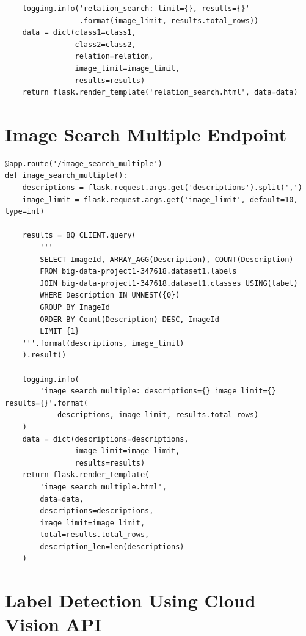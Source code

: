 \documentclass[a4paper, 11pt]{article}
\newenvironment{code}{\captionsetup{type=listing}}{}
\begin{document}
\begin{appendix}
\begin{code}
\begin{verbatim}
    logging.info('relation_search: limit={}, results={}'
                 .format(image_limit, results.total_rows))
    data = dict(class1=class1,
                class2=class2,
                relation=relation,
                image_limit=image_limit,
                results=results)
    return flask.render_template('relation_search.html', data=data)
\end{verbatim}
\label{code:relation_search}
\end{code}

\pagebreak

\section{Image Search Multiple Endpoint}

\begin{code}
\begin{verbatim}
@app.route('/image_search_multiple')
def image_search_multiple():
    descriptions = flask.request.args.get('descriptions').split(',')
    image_limit = flask.request.args.get('image_limit', default=10, type=int)

    results = BQ_CLIENT.query(
        '''
        SELECT ImageId, ARRAY_AGG(Description), COUNT(Description)
        FROM big-data-project1-347618.dataset1.labels
        JOIN big-data-project1-347618.dataset1.classes USING(label)
        WHERE Description IN UNNEST({0})
        GROUP BY ImageId
        ORDER BY Count(Description) DESC, ImageId
        LIMIT {1}
    '''.format(descriptions, image_limit)
    ).result()

    logging.info(
        'image_search_multiple: descriptions={} image_limit={} results={}'.format(
            descriptions, image_limit, results.total_rows)
    )
    data = dict(descriptions=descriptions,
                image_limit=image_limit,
                results=results)
    return flask.render_template(
        'image_search_multiple.html',
        data=data,
        descriptions=descriptions,
        image_limit=image_limit,
        total=results.total_rows,
        description_len=len(descriptions)
    )
\end{verbatim}
\label{code:image_search_multiple}
\end{code}

\pagebreak

\section{Label Detection Using Cloud Vision API}


\end{appendix}
\end{document}
